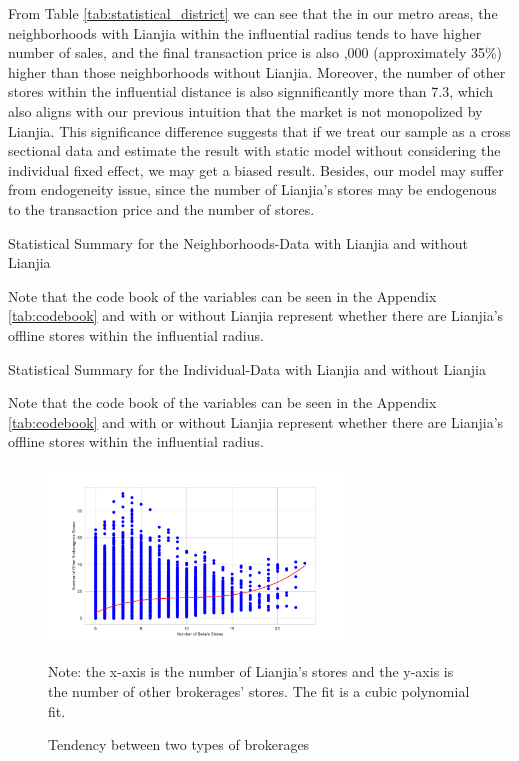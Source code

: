 \documentclass[11pt]{article}
\begin{document}
From Table \ref{tab:statistical_district} we can see that the in our metro areas, the neighborhoods with Lianjia within the influential radius tends to have higher number of sales, and the final transaction price is also ,000 (approximately 35\%) higher than those neighborhoods without Lianjia. Moreover, the number of other stores within the influential distance is also signnificantly more than 7.3, which also aligns with our previous intuition that the market is not monopolized by Lianjia. This significance difference suggests that if we treat our sample as a cross sectional data and estimate the result with static model without considering the individual fixed effect, we may get a biased result. Besides, our model may suffer from endogeneity issue, since the number of Lianjia's stores may be endogenous to the transaction price and the number of stores. 

\begin{table}[htb!]
    \centering
    \begin{tiny}
    \caption{Statistical Summary for the Neighborhoods-Data with Lianjia and without Lianjia}
    
    \label{tab:statistical_district}

    Note that the code book of the variables can be seen in the Appendix \ref{tab:codebook} and with or without Lianjia represent whether there are Lianjia's offline stores within the influential radius.
    \end{tiny}
\end{table}

\begin{table}[htb!]
  \centering
  \begin{tiny}
  \caption{Statistical Summary for the Individual-Data with Lianjia and without Lianjia}
  
  \label{tab:statistical_individual}

  Note that the code book of the variables can be seen in the Appendix \ref{tab:codebook} and with or without Lianjia represent whether there are Lianjia's offline stores within the influential radius.
  \end{tiny}  
\end{table}

\begin{figure}
    \centering
    \includegraphics[width=0.7\textwidth]{../figures/scatter_plot_with_two_brokerages.pdf}
    \caption{Tendency between two types of brokerages}
    \label{fig:same_distribution}
    Note: the x-axis is the number of Lianjia's stores and the y-axis is the number of other brokerages' stores. The fit is a cubic polynomial fit.
\end{figure}
\end{document}
